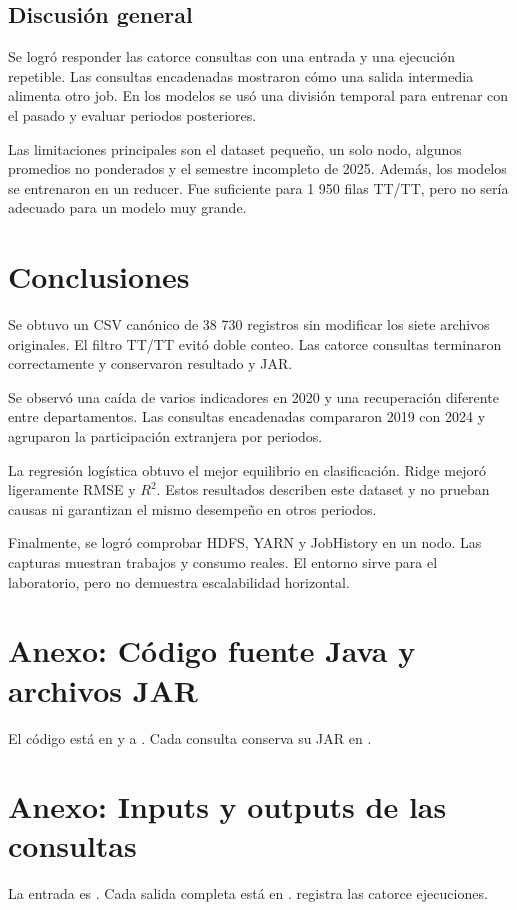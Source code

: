 \documentclass[10pt,a4paper]{article}
\theoremstyle{definition}
\begin{document}
\subsection{Discusión general}
Se logró responder las catorce consultas con una entrada y una ejecución
repetible. Las consultas encadenadas mostraron cómo una salida intermedia
alimenta otro job. En los modelos se usó una división temporal para entrenar
con el pasado y evaluar periodos posteriores.

Las limitaciones principales son el dataset pequeño, un solo nodo, algunos
promedios no ponderados y el semestre incompleto de 2025. Además, los modelos
se entrenaron en un reducer. Fue suficiente para 1 950 filas TT/TT, pero no
sería adecuado para un modelo muy grande.

\section{Conclusiones}
Se obtuvo un CSV canónico de 38 730 registros sin modificar los siete archivos
originales. El filtro TT/TT evitó doble conteo. Las catorce consultas terminaron
correctamente y conservaron resultado y JAR.

Se observó una caída de varios indicadores en 2020 y una recuperación diferente
entre departamentos. Las consultas encadenadas compararon 2019 con 2024 y
agruparon la participación extranjera por periodos.

La regresión logística obtuvo el mejor equilibrio en clasificación. Ridge
mejoró ligeramente RMSE y $R^2$. Estos resultados describen este dataset y no
prueban causas ni garantizan el mismo desempeño en otros periodos.

Finalmente, se logró comprobar HDFS, YARN y JobHistory en un nodo. Las capturas
muestran trabajos y consumo reales. El entorno sirve para el laboratorio, pero
no demuestra escalabilidad horizontal.

\appendix
\section{Anexo: Código fuente Java y archivos JAR}
El código está en  y  a
. Cada consulta conserva su JAR en
.
\section{Anexo: Inputs y outputs de las consultas}
La entrada es . Cada salida
completa está en .
 registra las catorce ejecuciones.
\end{document}

